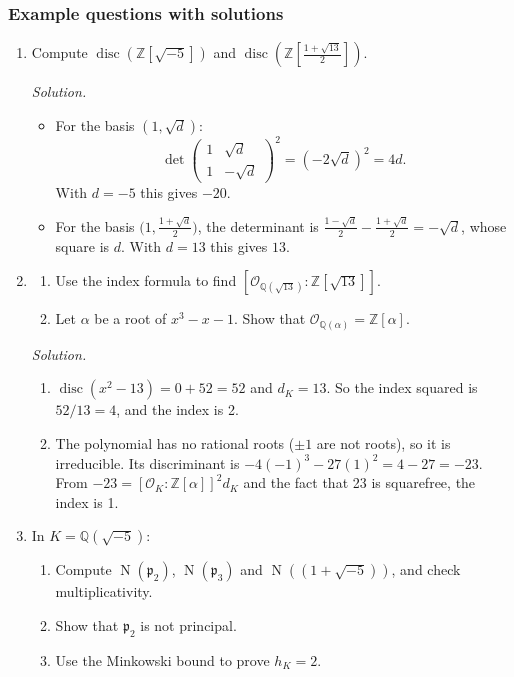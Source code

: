 \documentclass[11pt]{article}
\newcommand{\Z}{\mathbb{Z}}
\newcommand{\Q}{\mathbb{Q}}
\newcommand{\OK}{\mathcal{O}_K}
\newcommand{\cO}{\mathcal{O}}
\newcommand{\fp}{\mathfrak{p}}
\DeclareMathOperator{\Nm}{N}
\DeclareMathOperator{\disc}{disc}
\begin{document}
\subsubsection*{Example questions with solutions}
\begin{enumerate}[label=\textbf{Q3.\arabic*}]
  \item Compute $\disc(\Z[\sqrt{-5}])$ and $\disc\!\left(\Z\!\left[\tfrac{1+\sqrt{13}}{2}\right]\right)$.

  \textit{Solution.}
  \begin{itemize}
    \item For the basis $(1,\sqrt d)$:
    \[
    \det\begin{pmatrix}1&\sqrt d\\1&-\sqrt d\end{pmatrix}^2=(-2\sqrt d)^2=4d.
    \]
    With $d=-5$ this gives $-20$.
    \item For the basis $\bigl(1,\tfrac{1+\sqrt d}{2}\bigr)$, the determinant is $\tfrac{1-\sqrt d}{2}-\tfrac{1+\sqrt d}{2}=-\sqrt d$, whose square is $d$. With $d=13$ this gives $13$.
  \end{itemize}

  \item
  \begin{enumerate}[label=(\alph*)]
    \item Use the index formula to find $[\cO_{\Q(\sqrt{13})}:\Z[\sqrt{13}]]$.
    \item Let $\alpha$ be a root of $x^3-x-1$. Show that $\cO_{\Q(\alpha)}=\Z[\alpha]$.
  \end{enumerate}

  \textit{Solution.}
  \begin{enumerate}[label=(\alph*)]
    \item $\disc(x^2-13)=0+52=52$ and $d_K=13$. So the index squared is $52/13=4$, and the index is 2.
    \item The polynomial has no rational roots ($\pm1$ are not roots), so it is irreducible. Its discriminant is $-4(-1)^3-27(1)^2=4-27=-23$. From $-23=[\OK:\Z[\alpha]]^2d_K$ and the fact that 23 is squarefree, the index is 1.
  \end{enumerate}

  \item In $K=\Q(\sqrt{-5})$:
  \begin{enumerate}[label=(\alph*)]
    \item Compute $\Nm(\fp_2)$, $\Nm(\fp_3)$ and $\Nm((1+\sqrt{-5}))$, and check multiplicativity.
    \item Show that $\fp_2$ is not principal.
    \item Use the Minkowski bound to prove $h_K=2$.
  \end{enumerate}


\end{enumerate}
\end{document}
